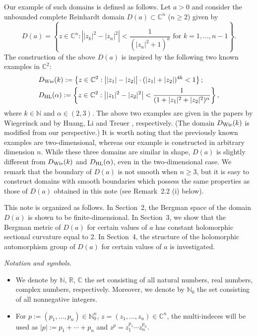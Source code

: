 \documentclass[12pt]{amsart}
\numberwithin{equation}{section}
\theoremstyle{definition}
\theoremstyle{remark}
\newcommand{\R}{{\mathbb R}}
\newcommand{\C}{{\mathbb C}}
\newcommand{\N}{{\mathbb N}}
\newcommand{\1}{{\bf 1}}
\begin{document}
Our example of such domains is defined as follows. 
Let $a>0$ and 
consider the unbounded complete Reinhardt domain 
$D(a) \subset \mathbb{C}^n$ ($n \geq 2$) given by
\begin{equation}\label{eqn:1.1}
D(a)=
\left\{
z\in\C^n: 
\left||z_k|^2-|z_n|^2\right|<\frac{1}{(|z_n|^2+1)^{a}}
\text{ for $k=1,\ldots,n-1$}
\right\}.
\end{equation}
%
The construction of the above $D(a)$ 
is inspired by the following two known 
examples in $\C^2$:
\begin{equation}\label{eqn:1.2}
\begin{split}
&D_{\rm Wie}(k):=
\left\{z\in\C^2:  
\big||z_1|-|z_2|\big|\cdot (|z_1|+|z_2|)^{4k}<1
\right\};\\
&D_{\rm HL}(\alpha):=
\left\{z\in\C^2: 
\left||z_1|^2-|z_2|^2\right|<\frac{1}{(1+|z_1|^2+|z_2|^2)^{\alpha}}
\right\},
\end{split}
\end{equation}
where $k\in\N$ %
and $\alpha\in(2,3)$.
The above two examples 
are 
given in the papers by Wiegerinck \cite{Wie84} and
by Huang, Li and Treuer \cite{HLT25}, respectively. 
(The domain $D_{\rm Wie}(k)$ is modified from our perspective.) 
It is worth noting that the previously known examples 
are two-dimensional, 
whereas our example is constructed in arbitrary dimension $n$. 
While these three domains are similar in shape, 
$D(a)$ is slightly different from $D_{\rm Wie}(k)$ 
and $D_{\rm HL}(\alpha)$, 
even in the two-dimensional case.
We remark that 
the boundary of $D(a)$ is not smooth 
when $n\geq 3$, but it is easy to 
construct domains with smooth boundaries
which possess the same properties 
as those of $D(a)$ obtained  
in this note (see Remark~2.2 (i) below).

This note is organized as follows. 
In Section~2, 
the Bergman space of the domain 
$D(a)$ is shown to be finite-dimensional.
In Section~3, we show that 
the Bergman metric of $D(a)$ 
for certain values of $a$
has constant 
holomorphic sectional curvature 
equal to $2$. 
In Section~4, the structure of  
the holomorphic 
automorphism group of $D(a)$ 
for certain values of $a$ is investigated. 


\smallskip


{\it Notation and symbols.}\quad
\begin{itemize}%
\item
We denote by $\N$, $\R$, $\C$ the set consisting of 
all natural numbers, real numbers, 
complex numbers, respectively. 
Moreover, we denote by $\N_0$
the set consisting of all nonnegative integers.
\item
For $p:=(p_1,\ldots,p_n)\in\N_0^n$, 
$z=(z_1,\ldots,z_n)\in\C^n$, 
the multi-indeces will be used as 
$
|p|:=p_1+\cdots+p_n$ and
$z^{p}=z_1^{p_1}\cdots z_n^{p_n}.
$
\end{itemize}
\end{document}

